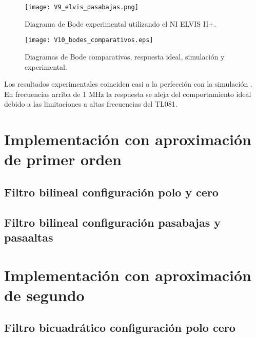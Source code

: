 	\begin{figure}[!ht]
		\caption{Diagrama de Bode experimental utilizando el NI ELVIS II+.}
		\label{fig:V9_elvis_pasabajas}
		\centering
		\texttt{[image: V9\_elvis\_pasabajas.png]}
	\end{figure}
	
	\begin{figure}[!ht]
		\caption{Diagramas de Bode comparativos, respuesta ideal, simulación y experimental.}
		\label{fig:V10_bodes_comparativos}
		\centering
		\texttt{[image: V10\_bodes\_comparativos.eps]}
	\end{figure}
	Los resultados experimentales coinciden casi a la perfección con la simulación . En frecuencias arriba de 1 MHz la respuesta se aleja del comportamiento ideal debido a las limitaciones a altas frecuencias del TL081.
	
	\section{Implementación con aproximación de primer orden}
	
		\subsection{Filtro bilineal configuración polo y cero}

		\subsection{Filtro bilineal configuración pasabajas y pasaaltas}

	
	\section{Implementación con aproximación de segundo}
	
		\subsection{Filtro bicuadrático configuración polo cero}